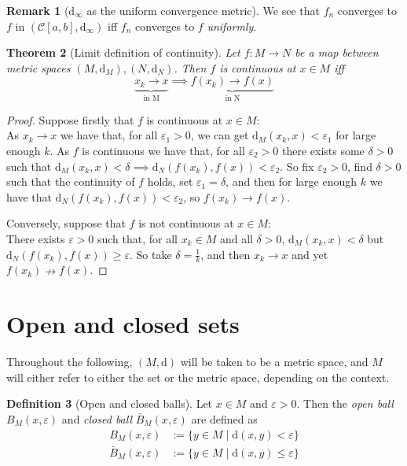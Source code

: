 \documentclass[10pt,fleqn]{article}
\newcommand{\met}{\mathrm{d}}
\newcommand{\eps}{\varepsilon}
\theoremstyle{definition} \newtheorem{defn}{Definition}[section]
\theoremstyle{plain}      \newtheorem{thm}[defn]{Theorem}
\theoremstyle{definition} \newtheorem{prop}[defn]{Proposition}
\theoremstyle{definition} \newtheorem{cor}[defn]{Corollary}
\theoremstyle{definition} \newtheorem{ex}[defn]{Example}
\theoremstyle{definition} \newtheorem{rem}[defn]{Remark}
\begin{document}
\begin{rem}[$\met_{\infty}$ as the uniform convergence metric]
    We see that $f_n$ converges to $f$ in $(\mathcal{C}[a,b],\met_{\infty})$ iff $f_n$ converges to $f$ \emph{uniformly}.
\end{rem}

\begin{thm}[Limit definition of continuity]
    Let $f:M\to N$ be a map between metric spaces $(M,\met_M),(N,\met_N)$.
    Then $f$ is continuous at $x\in M$ iff
    \[
        \underbrace{x_k\to x}_{\text{in M}}
        \implies \underbrace{f(x_k)\to f(x)}_{\text{in N}}
    \]
\end{thm}

\begin{proof}
    Suppose firstly that $f$ is continuous at $x\in M$:\\
    As $x_k\to x$ we have that, for all $\eps_1>0$, we can get $\met_M(x_k,x)<\eps_1$ for large enough $k$.
    As $f$ is continuous we have that, for all $\eps_2>0$ there exists some $\delta>0$ such that $\met_M(x_k,x)<\delta \implies \met_N(f(x_k),f(x))<\eps_2$.
    So fix $\eps_2>0$, find $\delta>0$ such that the continuity of $f$ holds, set $\eps_1=\delta$, and then for large enough $k$ we have that $\met_N(f(x_k),f(x))<\eps_2$, so $f(x_k)\to f(x)$.

    Conversely, suppose that $f$ is not continuous at $x\in M$:\\
    There exists $\eps>0$ such that, for all $x_k\in M$ and all $\delta>0$, $\met_M(x_k,x)<\delta$ but $\met_N(f(x_k),f(x))\geq\eps$.
    So take $\delta = \frac{1}{k}$, and then $x_k\to x$ and yet $f(x_k)\nrightarrow f(x)$.
\end{proof}


\section{Open and closed sets}

Throughout the following, $(M,\met)$ will be taken to be a metric space, and $M$ will either refer to either the set or the metric space, depending on the context.

\begin{defn}[Open and closed balls]
    Let $x\in M$ and $\eps>0$.
    Then the \emph{open ball} $B_M(x,\eps)$ and \emph{closed ball} $\bar{B}_M(x,\eps)$ are defined as
    \begin{align*}
        B_M(x,\eps) &:= \{y\in M \mid \met(x,y)<\eps\}\\
        \bar{B}_M(x,\eps) &:= \{y\in M \mid \met(x,y)\leq\eps\}
    \end{align*}
\end{defn}
\end{document}
